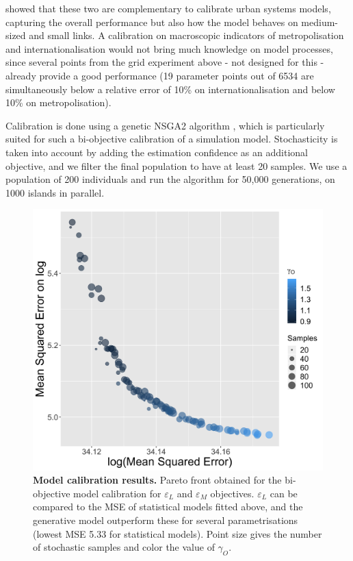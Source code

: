 \documentclass[10pt,letterpaper]{article}
\begin{document}
\cite{raimbault2018indirect} showed that these two are complementary to calibrate urban systems models, capturing the overall performance but also how the model behaves on medium-sized and small links. A calibration on macroscopic indicators of metropolisation and internationalisation would not bring much knowledge on model processes, since several points from the grid experiment above - not designed for this - already provide a good performance (19 parameter points out of 6534 are simultaneously below a relative error of 10\% on internationalisation and below 10\% on metropolisation).

Calibration is done using a genetic NSGA2 algorithm \cite{deb2002fast}, which is particularly suited for such a bi-objective calibration of a simulation model. Stochasticity is taken into account by adding the estimation confidence as an additional objective, and we filter the final population to have at least 20 samples. We use a population of 200 individuals and run the algorithm for 50,000 generations, on 1000 islands in parallel.


\begin{figure}
	\begin{center}
    \includegraphics[width=0.75\linewidth]{figures/Fig8.png}
    \end{center}
    \vspace{2cm}
	\caption{\textbf{Model calibration results.} Pareto front obtained for the bi-objective model calibration for $\varepsilon_L$ and $\varepsilon_M$ objectives. $\varepsilon_L$ can be compared to the MSE of statistical models fitted above, and the generative model outperform these for several parametrisations (lowest MSE 5.33 for statistical models). Point size gives the number of stochastic samples and color the value of $\gamma_O$.\label{fig:fig8}}
\end{figure}
\end{document}

